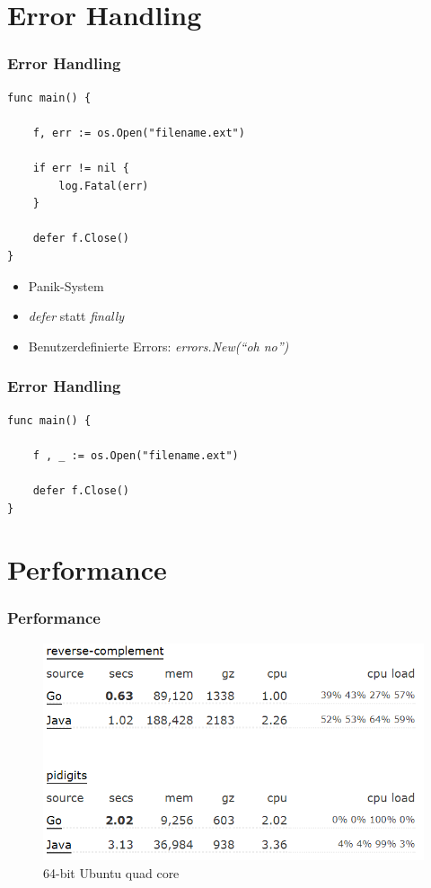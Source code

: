 \documentclass{beamer}
\begin{document}

\section{Error Handling}
\begin{frame}[fragile]
\frametitle{Error Handling}

\begin{lstlisting} 
func main() {

    f, err := os.Open("filename.ext")

    if err != nil {
        log.Fatal(err)
    }

    defer f.Close()
}
\end{lstlisting}

\begin{itemize}
\item Panik-System
\item \textit{defer} statt \textit{finally}
\item Benutzerdefinierte Errors: \textit{errors.New(``oh no'')}
\end{itemize}

\end{frame}

\begin{frame}[fragile]
\frametitle{Error Handling}

\begin{lstlisting} 
func main() {

    f , _ := os.Open("filename.ext")

    defer f.Close()
}
\end{lstlisting}

\end{frame}


\section{Performance}
\begin{frame}
\frametitle{Performance}

\centering
\begin{figure}
\includegraphics[scale=0.6]{performance1.png}
\caption{64-bit Ubuntu quad core}
\end{figure}

\end{frame}
\end{document}
